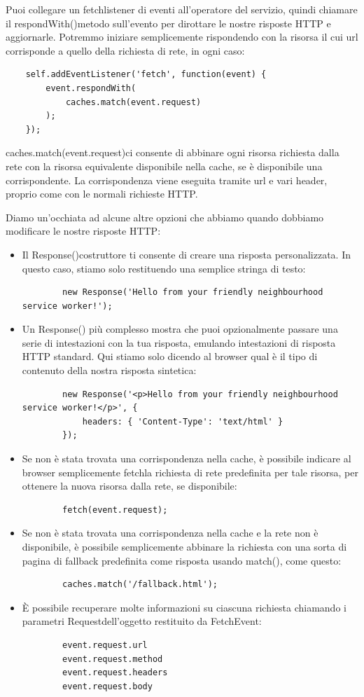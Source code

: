 \documentclass[italian]{article}
\begin{document}
Puoi collegare un fetchlistener di eventi all'operatore del servizio, quindi chiamare il respondWith()metodo sull'evento per dirottare le nostre risposte HTTP e aggiornarle. Potremmo iniziare semplicemente rispondendo con la risorsa il cui url corrisponde a quello della richiesta di rete, in ogni caso:

\begin{lstlisting}
	self.addEventListener('fetch', function(event) {
		event.respondWith(
			caches.match(event.request)
		);
	});
\end{lstlisting}
caches.match(event.request)ci consente di abbinare ogni risorsa richiesta dalla rete con la risorsa equivalente disponibile nella cache, se è disponibile una corrispondente. La corrispondenza viene eseguita tramite url e vari header, proprio come con le normali richieste HTTP.

Diamo un'occhiata ad alcune altre opzioni che abbiamo quando dobbiamo modificare le nostre risposte HTTP:
\begin{itemize}
	\item Il Response()costruttore ti consente di creare una risposta personalizzata. In questo caso, stiamo solo restituendo una semplice stringa di testo:
	\begin{lstlisting}
		new Response('Hello from your friendly neighbourhood service worker!');
	\end{lstlisting}
	\item Un Response() più complesso mostra che puoi opzionalmente passare una serie di intestazioni con la tua risposta, emulando intestazioni di risposta HTTP standard. Qui stiamo solo dicendo al browser qual è il tipo di contenuto della nostra risposta sintetica:
	\begin{lstlisting}
		new Response('<p>Hello from your friendly neighbourhood service worker!</p>', {
			headers: { 'Content-Type': 'text/html' }
		});
	\end{lstlisting}
	\item Se non è stata trovata una corrispondenza nella cache, è possibile indicare al browser semplicemente fetchla richiesta di rete predefinita per tale risorsa, per ottenere la nuova risorsa dalla rete, se disponibile:
	\begin{lstlisting}
		fetch(event.request);
	\end{lstlisting}
	\item Se non è stata trovata una corrispondenza nella cache e la rete non è disponibile, è possibile semplicemente abbinare la richiesta con una sorta di pagina di fallback predefinita come risposta usando match(), come questo:
	\begin{lstlisting}
		caches.match('/fallback.html');
	\end{lstlisting}
	\item È possibile recuperare molte informazioni su ciascuna richiesta chiamando i parametri Requestdell'oggetto restituito da FetchEvent:
	\begin{lstlisting}
		event.request.url
		event.request.method
		event.request.headers
		event.request.body
	\end{lstlisting}
\end{itemize}
\end{document}
